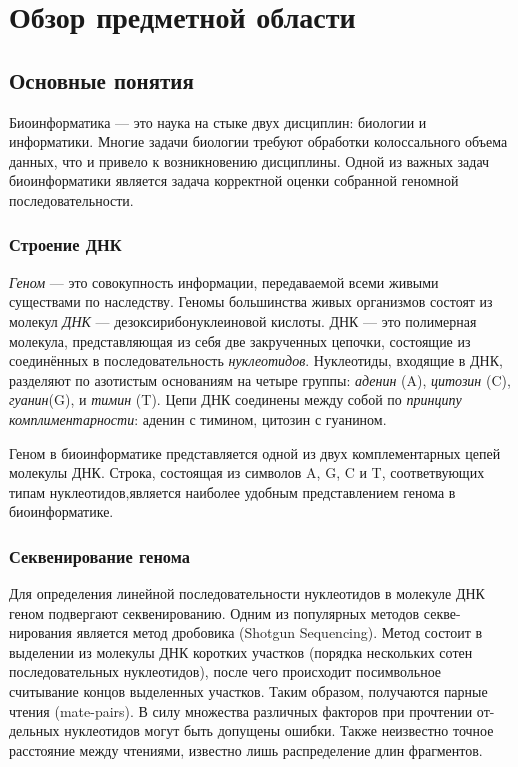 \chapter{Обзор предметной области}
\label{chapter1}

\section{Основные понятия}

Биоинформатика \cite{scala_lang} — это наука на стыке двух дисциплин: биологии и информатики. Многие задачи биологии требуют обработки колоссального объема данных, что и привело к возникновению дисциплины. Одной из важных задач биоинформатики является задача корректной оценки собранной геномной последовательности.

\subsection{Строение ДНК}

\textit{Геном} — это совокупность информации, передаваемой всеми живыми существами по наследству. Геномы большинства живых организмов состоят из молекул \textit{ДНК} — дезоксирибонуклеиновой кислоты. ДНК — это полимерная молекула, представляющая из себя две закрученных цепочки, состоящие из соединённых в последовательность \textit{нуклеотидов}. Нуклеотиды, входящие в ДНК, разделяют по азотистым основаниям на четыре группы: \textit{аденин} (A), \textit{цитозин} (C), \textit{гуанин}(G),  и \textit{тимин} (T). Цепи ДНК соединены между собой по \textit{принципу комплиментарности}: аденин с тимином, цитозин с гуанином.

Геном в биоинформатике представляется одной из двух комплементарных  цепей молекулы ДНК. Строка, состоящая из символов A, G, C и T, соответвующих типам нуклеотидов,является наиболее удобным представлением генома в биоинформатике.


\subsection{Секвенирование генома}

Для определения линейной последовательности нуклеотидов в молекуле ДНК геном подвергают секвенированию. Одним из популярных методов секве-нирования является метод дробовика (Shotgun Sequencing). Метод состоит в выделении из молекулы ДНК коротких участков (порядка нескольких сотен последовательных нуклеотидов), после чего происходит посимвольное считывание концов выделенных участков. Таким образом, получаются парные чтения (mate-pairs). В силу множества различных факторов при прочтении от-дельных нуклеотидов могут быть допущены ошибки. Также неизвестно точное расстояние между чтениями, известно лишь распределение длин фрагментов.

